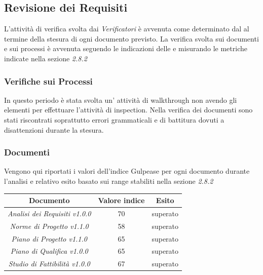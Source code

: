 {  \subsection{Revisione dei Requisiti}

  L’attività di verifica svolta dai  \emph{Verificatori}  è avvenuta come determinato dal \emph{\pianodiprogetto} al termine della stesura di ogni documento previsto. La verifica svolta sui documenti e
  sui processi è avvenuta seguendo le indicazioni delle  \emph{\normediprogetto}  e misurando le
  metriche indicate nella sezione \emph{2.8.2}

  \subsubsection{Verifiche sui Processi}

  In questo periodo è stata svolta un' attività di walkthrough non avendo gli elementi
  per effettuare l'attività di inspection. Nella verifica dei
  documenti sono stati riscontrati soprattutto errori grammaticali e
  di battitura dovuti a disattenzioni durante la stesura. 

  \subsubsection{Documenti}
  Vengono qui riportati i valori dell’indice Gulpease per ogni documento durante l’analisi e relativo
  esito basato sui range stabiliti nella sezione \emph{2.8.2}
  \begin{center}
    \begin{tabular}{|c|c|c|}
      \hline
      \textbf{Documento} & \textbf{Valore indice} & \textbf{Esito} \\
      \hline
      \emph{Analisi dei Requisiti v1.0.0}  & 70 & superato \\
      \hline
      \emph{Norme di Progetto v1.1.0}   & 58  & superato \\
      \hline
      \emph{Piano di Progetto v1.1.0}   & 65 & superato \\
      \hline
      \emph{Piano di Qualifica v1.0.0}   & 65 & superato \\
      \hline
      \emph{Studio di Fattibilità v1.0.0}  & 67 & superato \\
      \hline
    \end{tabular}
  \end{center}



}
